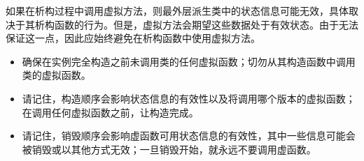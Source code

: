 如果在析构过程中调用虚拟方法，则最外层派生类中的状态信息可能无效，具体取决于其析构函数的行为。但是，虚拟方法会期望这些数据处于有效状态。由于无法保证这一点，因此应始终避免在析构函数中使用虚拟方法。


\begin{itemize}
\item
确保在实例完全构造之前未调用类的任何虚拟函数；切勿从其构造函数中调用类的虚拟函数。

\item
请记住，构造顺序会影响状态信息的有效性以及将调用哪个版本的虚拟函数；在调用任何虚拟函数之前，让构造完成。

\item
请记住，销毁顺序会影响虚函数可用状态信息的有效性，其中一些信息可能会被销毁或以其他方式无效；一旦销毁开始，就永远不要调用虚函数。
\end{itemize}


